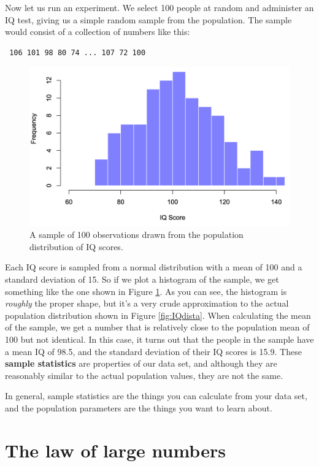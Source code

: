 \documentclass[
]{book}
\theoremstyle{definition}
\theoremstyle{definition}
\theoremstyle{definition}
\theoremstyle{definition}
\theoremstyle{remark}
\begin{document}
Now let us run an experiment. We select 100 people at random and administer an IQ test, giving us a simple random sample from the population. The sample would consist of a collection of numbers like this:

\begin{verbatim}
 106 101 98 80 74 ... 107 72 100
\end{verbatim}

\begin{figure}

{\centering \includegraphics[width=0.66\linewidth]{resources/image/IQdistb} 

}

\caption{A sample of 100 observations drawn from the population distribution of IQ scores.}\label{fig:IQdistb}
\end{figure}

Each IQ score is sampled from a normal distribution with a mean of 100 and a standard deviation of 15. So if we plot a histogram of the sample, we get something like the one shown in Figure \ref{fig:IQdistb}. As you can see, the histogram is \emph{roughly} the proper shape, but it's a very crude approximation to the actual population distribution shown in Figure \ref{fig:IQdista}. When calculating the mean of the sample, we get a number that is relatively close to the population mean of 100 but not identical. In this case, it turns out that the people in the sample have a mean IQ of 98.5, and the standard deviation of their IQ scores is 15.9. These \textbf{sample statistics} are properties of our data set, and although they are reasonably similar to the actual population values, they are not the same.

In general, sample statistics are the things you can calculate from your data set, and the population parameters are the things you want to learn about.

\hypertarget{lawlargenumbers}{%
\section{The law of large numbers}\label{lawlargenumbers}}
\end{document}

